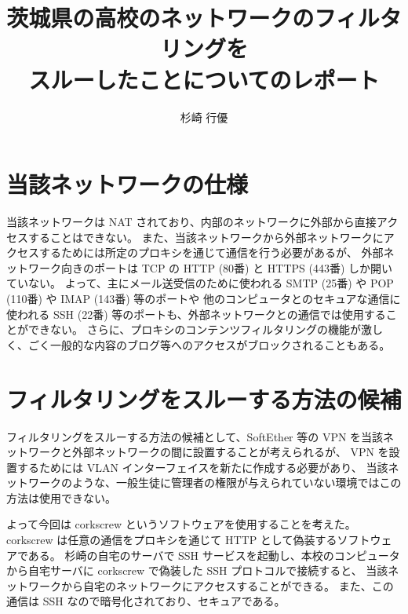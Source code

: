\documentclass{jsarticle}
\title{茨城県の高校のネットワークのフィルタリングを \\ スルーしたことについてのレポート}
\author{杉崎 行優}
\date{}
\begin{document}
\maketitle
{}

\section{当該ネットワークの仕様}
当該ネットワークは NAT されており、内部のネットワークに外部から直接アクセスすることはできない。
また、当該ネットワークから外部ネットワークにアクセスするためには所定のプロキシを通じて通信を行う必要があるが、
外部ネットワーク向きのポートは TCP の HTTP (80番) と HTTPS (443番) しか開いていない。
よって、主にメール送受信のために使われる SMTP (25番) や POP (110番) や IMAP (143番) 等のポートや
他のコンピュータとのセキュアな通信に使われる SSH (22番) 等のポートも、外部ネットワークとの通信では使用することができない。
さらに、プロキシのコンテンツフィルタリングの機能が激しく、ごく一般的な内容のブログ等へのアクセスがブロックされることもある。

\section{フィルタリングをスルーする方法の候補}
フィルタリングをスルーする方法の候補として、SoftEther 等の VPN を当該ネットワークと外部ネットワークの間に設置することが考えられるが、
VPN を設置するためには VLAN インターフェイスを新たに作成する必要があり、
当該ネットワークのような、一般生徒に管理者の権限が与えられていない環境ではこの方法は使用できない。

よって今回は corkscrew というソフトウェアを使用することを考えた。
corkscrew は任意の通信をプロキシを通じて HTTP として偽装するソフトウェアである。
杉崎の自宅のサーバで SSH サービスを起動し、本校のコンピュータから自宅サーバに corkscrew で偽装した SSH プロトコルで接続すると、
当該ネットワークから自宅のネットワークにアクセスすることができる。
また、この通信は SSH なので暗号化されており、セキュアである。
\end{document}
